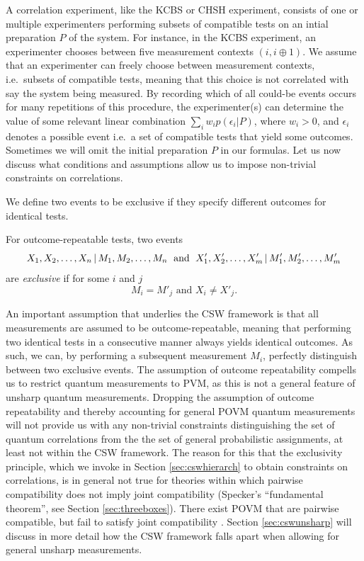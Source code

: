 A correlation experiment, like the KCBS or CHSH experiment, consists of one or multiple experimenters performing subsets of compatible tests on an intial preparation $P$ of the system. For instance, in the KCBS experiment, an experimenter chooses between five measurement contexts $(i,i\oplus 1)$. We assume that an experimenter can freely choose between measurement contexts, i.e.\ subsets of compatible tests, meaning that this choice is not correlated with say the system being measured. By recording which of all could-be events occurs for many repetitions of this procedure, the experimenter(s) can determine the value of some relevant linear combination $\sum_i w_i p(\epsilon_i\vert P)$, where $w_i>0$, and $\epsilon_i$ denotes a possible event i.e.\ a set of compatible tests that yield some outcomes. Sometimes we will omit the initial preparation $P$ in our formulas. Let us now discuss what conditions and assumptions allow us to impose non-trivial constraints on correlations.

We define two events to be exclusive if they specify different outcomes for identical tests.
\begin{definition}
\label{def:exclevents}
For outcome-repeatable tests, two events
\begin{equation*}
X_1,X_2,\dots, X_n\thinspace\vert\thinspace M_1,M_2,\dots, M_n\;\text{ and }\; X'_1,X'_2,\dots, X'_m\thinspace\vert\thinspace M'_1,M'_2,\dots, M'_m  
\end{equation*} are \emph{exclusive} if for some $i$ and $j$
\begin{equation*}
    M_i = M'_j \text{ and } X_i \neq X'_j.
\end{equation*}
\end{definition}

An important assumption that underlies the CSW framework is that all measurements are assumed to be outcome-repeatable, meaning that performing two identical tests in a consecutive manner always yields identical outcomes. As such, we can, by performing a subsequent measurement $M_i$, perfectly distinguish between two exclusive events. The assumption of outcome repeatability compells us to restrict quantum measurements to PVM, as this is not a general feature of unsharp quantum measurements. Dropping the assumption of outcome repeatability and thereby accounting for general POVM quantum measurements will not provide us with any non-trivial constraints distinguishing the set of quantum correlations from the the set of general probabilistic assignments, at least not within the CSW framework. The reason for this that the exclusivity principle, which we invoke in Section \ref{sec:cswhierarch} to obtain constraints on correlations, is in general not true for theories within which pairwise compatibility does not imply joint compatibility (Specker's ``fundamental theorem'', see Section \ref{sec:threeboxes}). There exist POVM that are pairwise compatible, but fail to satisfy joint compatibility \cite{Heunen2014}. Section \ref{sec:cswunsharp} will discuss in more detail how the CSW framework falls apart when allowing for general unsharp measurements.

